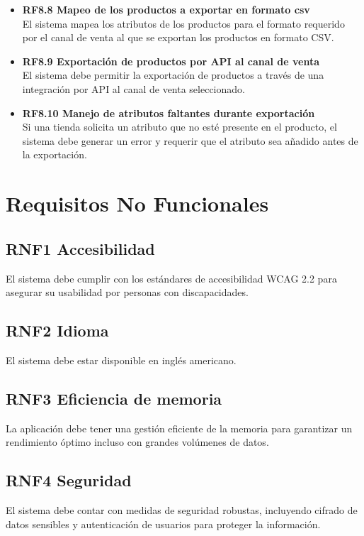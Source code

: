 \documentclass[12pt.a4paper]{article}
\begin{document}
\begin{itemize}
    \item \textbf{RF8.8 Mapeo de los productos a exportar en formato csv} \\
    El sistema mapea los atributos de los productos para el formato requerido por el canal de venta al que se exportan los productos en formato CSV.

    \item \textbf{RF8.9 Exportación de productos por API al canal de venta} \\
    El sistema debe permitir la exportación de productos a través de una integración por API al canal de venta seleccionado.

    \item \textbf{RF8.10 Manejo de atributos faltantes durante exportación} \\
    Si una tienda solicita un atributo que no esté presente en el producto, el sistema debe generar un error y requerir que el atributo sea añadido antes de la exportación.
\end{itemize}

\section{Requisitos No Funcionales}
\subsection*{RNF1 Accesibilidad}
El sistema debe cumplir con los estándares de accesibilidad WCAG 2.2 para asegurar su usabilidad por personas con discapacidades.

\subsection*{RNF2 Idioma}
El sistema debe estar disponible en inglés americano.

\subsection*{RNF3 Eficiencia de memoria}
La aplicación debe tener una gestión eficiente de la memoria para garantizar un rendimiento óptimo incluso con grandes volúmenes de datos.

\subsection*{RNF4 Seguridad}
El sistema debe contar con medidas de seguridad robustas, incluyendo cifrado de datos sensibles y autenticación de usuarios para proteger la información.
\end{document}
